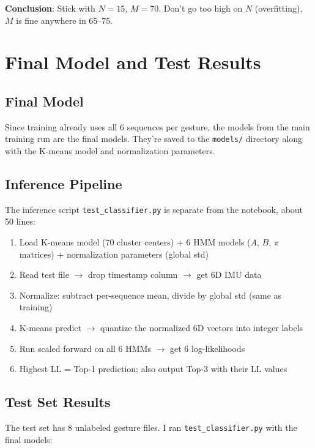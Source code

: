 \documentclass[11pt]{article}
\begin{document}
\textbf{Conclusion}: Stick with $N=15$, $M=70$. Don't go too high on $N$ (overfitting), $M$ is fine anywhere in 65--75.


\section{Final Model and Test Results}

\subsection{Final Model}

Since training already uses all 6 sequences per gesture, the models from the main training run are the final models. They're saved to the \texttt{models/} directory along with the K-means model and normalization parameters.

\subsection{Inference Pipeline}

The inference script \texttt{test\_classifier.py} is separate from the notebook, about 50 lines:

\begin{enumerate}[nosep]
    \item Load K-means model (70 cluster centers) + 6 HMM models ($A$, $B$, $\pi$ matrices) + normalization parameters (global std)
    \item Read test file $\to$ drop timestamp column $\to$ get 6D IMU data
    \item Normalize: subtract per-sequence mean, divide by global std (same as training)
    \item K-means predict $\to$ quantize the normalized 6D vectors into integer labels
    \item Run scaled forward on all 6 HMMs $\to$ get 6 log-likelihoods
    \item Highest LL = Top-1 prediction; also output Top-3 with their LL values
\end{enumerate}

\subsection{Test Set Results}

The test set has 8 unlabeled gesture files. I ran \texttt{test\_classifier.py} with the final models:
\end{document}
